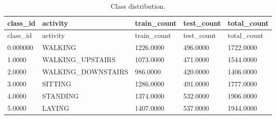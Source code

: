 \documentclass[11pt]{report}
\begin{document}
\begin{longtable}{lllll}
\caption{Class distribution.}\\
\toprule
class\_id & activity & train\_count & test\_count & total\_count \\
\midrule
\endfirsthead
\toprule
class\_id & activity & train\_count & test\_count & total\_count \\
\midrule
\endhead
0.000000 & WALKING & 1226.0000 & 496.0000 & 1722.0000 \\
1.0000 & WALKING\_UPSTAIRS & 1073.0000 & 471.0000 & 1544.0000 \\
2.0000 & WALKING\_DOWNSTAIRS & 986.0000 & 420.0000 & 1406.0000 \\
3.0000 & SITTING & 1286.0000 & 491.0000 & 1777.0000 \\
4.0000 & STANDING & 1374.0000 & 532.0000 & 1906.0000 \\
5.0000 & LAYING & 1407.0000 & 537.0000 & 1944.0000 \\
\bottomrule
\end{longtable}
\end{document}
